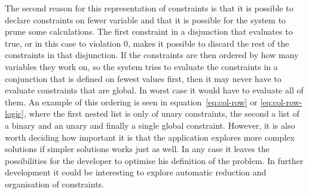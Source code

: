 The second reason for this representation of constraints is that it is possible to declare constraints on fewer variable and that it is possible for the system to prune some calculations. The first constraint in a disjunction that evaluates to true, or in this case to violation $0$, makes it possible to discard the rest of the constraints in that disjunction. If the constraints are then ordered by how many variables they work on, so the system tries to evaluate the constraints in a conjunction that is defined on fewest values first, then it may never have to evaluate constraints that are global. In worst case it would have to evaluate all of them. An example of this ordering is seen in equation~\ref{eq:col-row} or \ref{eq:col-row-logic}, where the first nested list is only of unary constraints, the second a list of a binary and an unary and finally a single global constraint. However, it is also worth deciding how important it is that the application explores more complex solutions if simpler solutions works just as well. In any case it leaves the possibilities for the developer to optimise his definition of the problem. In further development it could be interesting to explore automatic reduction and organisation of constraints.

